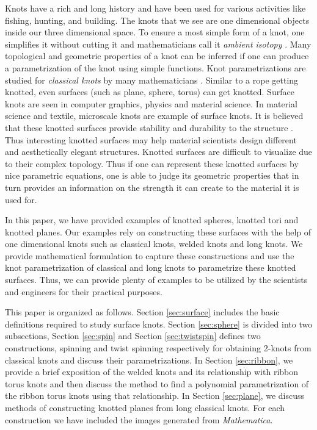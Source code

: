 \documentclass[10pt,a4paper,reqno]{amsart}
\theoremstyle{definition}
\theoremstyle{remark}
\begin{document}
Knots have a rich and long history and have been used for various activities like fishing, hunting, and building. The knots that we see are one dimensional objects inside our three dimensional space. To ensure a most simple form of a knot, one simplifies it without cutting it and mathematicians call it {\it ambient isotopy} \cite{Colin}. Many topological and geometric properties of a knot can be inferred if one can produce a parametrization 
of the knot using simple functions. Knot parametrizations are studied for {\it classical knots} by many mathematicians \cite{Shastri, Kau98, PraMis, Dun}.  Similar to a rope getting knotted, even surfaces (such as plane, sphere, torus) can get knotted. Surface knots are seen in computer graphics, physics and material science. In material science and textile, microscale   knots \cite{Sherif} are example of surface knots.
It is believed that these knotted surfaces provide stability and durability to the structure \cite{Moestopo}. Thus interesting knotted surfaces may help material scientists  design different and aesthetically  elegant structures.  Knotted surfaces are difficult to visualize due to their complex topology.
Thus if one can represent these knotted surfaces by nice parametric equations, one is able to judge its geometric properties that in turn provides an information on the strength it can create to the material it is used for.

In this paper, we have provided examples of knotted spheres, knotted tori and knotted planes. Our examples rely on constructing these surfaces with the help of one dimensional knots such as classical knots,  welded knots and long knots. We provide mathematical formulation to capture these constructions and use the knot parametrization of classical and long knots to parametrize these knotted surfaces. Thus, we can provide plenty of examples to be utilized by the scientists and engineers for their practical purposes.



This paper is organized as follows. Section \ref{sec:surface} includes the basic definitions required to study surface knots. Section \ref{sec:sphere} is divided into two subsections, Section \ref{sec:spin} and Section \ref{sec:twistspin} defines two constructions, spinning and twist spinning respectively for obtaining 2-knots from classical knots and discuss their parametrizations. In 
Section \ref{sec:ribbon}, we provide a brief exposition of the welded knots and its relationship with ribbon torus knots and then discuss the method to find a polynomial parametrization of the ribbon torus knots using that relationship. In Section \ref{sec:plane}, we discuss methods of constructing knotted planes from long classical knots. For each construction we have included the images generated from {\it Mathematica}.
\end{document}
